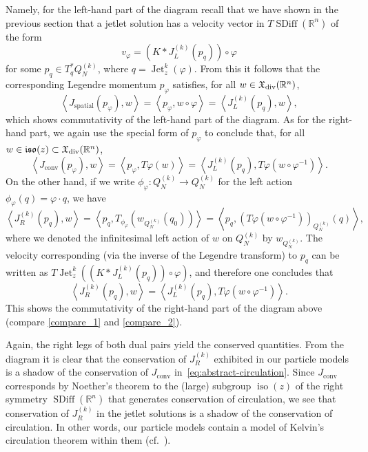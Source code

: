 \documentclass[12pt]{amsart}
\newcommand{\R}{\ensuremath{\mathbb{R}}}
\DeclareMathOperator{\SDiff}{SDiff}
\DeclareMathOperator{\Jet}{Jet}
\DeclareMathOperator{\iso}{iso}
\begin{document}
  Namely, for the left-hand part of the diagram recall that we have shown in the previous section that a jetlet solution has a velocity vector in $T \SDiff(\R^n)$ of the form
  \begin{equation*}
    v_{\varphi} = (K * J_L^{(k)}(p_q)) \circ \varphi
  \end{equation*}
  for some $p_q \in T^*_q Q^{(k)}_N$, where $q = \Jet^k_z(\varphi)$. From this it follows that the corresponding Legendre momentum $p_\varphi$ satisfies, for all $ w \in \mathfrak{X}_{\rm div}(\R^n)$,
  \begin{equation*}
  \left< J_\text{spatial}(p_\varphi), w\right> = \left< p_\varphi, w \circ \varphi \right> = \left< J_L^{(k)}(p_q), w \right>,
  \end{equation*}
  which shows commutativity of the left-hand part of the diagram. As for the right-hand part, we again use the special form of $p_\varphi$ to conclude that, for all $ w \in \mathfrak{iso}(z) \subset \mathfrak{X}_{\rm div}(\R^n)$,
 \begin{equation}
 	\left<J_\text{conv}(p_\varphi), w\right> = \left<p_\varphi, T\varphi  (w) \right> = \left<J_L^{(k)}(p_q),  T\varphi (w \circ \varphi^{-1}) \right>. \label{compare_1}
 \end{equation}
 On the other hand, if we write $\phi_\varphi: Q^{(k)}_N \to Q^{(k)}_N$ for the left action $\phi_\varphi (q) = \varphi \cdot q$, we have 
 \begin{equation*}
   \left<J_R^{(k)}(p_q), w\right> = \left< p_q, T_{\phi_\varphi} (w_{Q^{(k)}_N} (q_0))   \right> =  \left<p_q, (T\varphi (w \circ \varphi^{-1}) )_{Q^{(k)}_N} (q) \right>,
 \end{equation*}
 where we denoted the infinitesimal left action of $w$ on $Q^{(k)}_N$ by $w_{Q^{(k)}_N}$. The velocity corresponding (via the inverse of the Legendre transform) to $p_q$ can be written as $ T\Jet_z^k( (K * J_L^{(k)}(p_q)) \circ \varphi)$,
 and therefore one concludes that 
 \begin{equation}
 	\left<J_R^{(k)}(p_q), w\right> = \left< J_L^{(k)}(p_q), T \varphi (w \circ \varphi^{-1}) \right>. \label{compare_2}
 \end{equation}
 This shows the commutativity of the right-hand part of the  diagram above (compare \eqref{compare_1} and \eqref{compare_2}).
  
  Again, the right legs of both dual pairs yield the conserved quantities.
From the diagram it is clear that the conservation of $J_R^{(k)}$ exhibited in
our particle models is a shadow of the conservation of $J_\text{conv}$ in~\eqref{eq:abstract-circulation}.
Since $J_\text{conv}$ corresponds by Noether's theorem to the (large)
subgroup $\iso(z)$ of the right symmetry $\SDiff(\R^n)$ that generates
conservation of circulation, we see that conservation of $J_R^{(k)}$ in the jetlet solutions is a shadow
of the conservation of circulation.
In other words, our particle models contain a model of Kelvin's circulation theorem within them (cf.~\cite[Theorem 5.5]{JacobsRatiuDesbrun2013}).
\end{document}
